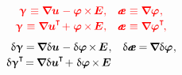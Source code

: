 \begin{otherlanguage}{russian}
\nopagebreak\vspace{-0.5em}
\begin{equation}\label{deformationtensors:micropolarcontinuum}
\begin{array}{rl}
{\color{red}{\bm{\upgamma} \hspace{.16ex} \equiv \boldnabla \fieldofdisplacements \hspace{.1ex} - \fieldofrotations \hspace{-0.12ex} \times \hspace{-0.2ex} \bm{E} ,}} &
{\color{red}{\mathboldae \hspace{.16ex} \equiv \boldnabla \fieldofrotations \hspace{.1ex} ,}}
\\[.2em]
%
{\color{red}{\bm{\upgamma} \hspace{.16ex} \equiv \boldnabla \fieldofdisplacements^{\hspace{-0.05ex}\T} \hspace{-0.3ex} + \hspace{.1ex} \fieldofrotations \hspace{-0.12ex} \times \hspace{-0.2ex} \bm{E} ,}} &
{\color{red}{\mathboldae \hspace{.16ex} \equiv \boldnabla \fieldofrotations^{\T} \hspace{-0.25ex} ,}}
\end{array}
\end{equation}
%
\nopagebreak\vspace{-0.25em}
\begin{equation*}
\begin{array}{rl}
\variation{\bm{\upgamma}}
= \hspace{-0.16ex} \boldnabla \variation{\fieldofdisplacements} \hspace{.1ex} - \variation{\fieldofrotations} \hspace{-0.2ex} \times \hspace{-0.2ex} \bm{E} \hspace{.1ex}
, &
\variation{\mathboldae} = \hspace{-0.16ex} \boldnabla \variation{\fieldofrotations} \hspace{.1ex} ,
\\[.2em]
%
\variation{\bm{\upgamma}}^{\T} \hspace{-0.32ex}
= \hspace{-0.16ex} \boldnabla \variation{\fieldofdisplacements}^{\hspace{-0.05ex}\T} \hspace{-0.3ex} + \hspace{.1ex} \variation{\fieldofrotations} \hspace{-0.2ex} \times \hspace{-0.2ex} \bm{E} \hspace{.1ex}

\end{array}
\end{equation*}
\end{otherlanguage}
